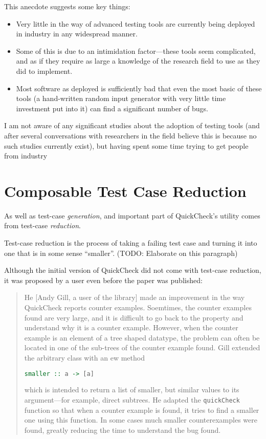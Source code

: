 This anecdote suggests some key things:

\begin{itemize}
\item Very little in the way of advanced testing tools are currently being deployed in industry in any widespread manner.
\item Some of this is due to an intimidation factor---these tools seem complicated,
and as if they require as large a knowledge of the research field to use as they did to implement.
\item Most software as deployed is sufficiently bad that even the most basic of these tools (a hand-written random input generator with very little time investment put into it) can find a significant number of bugs.
\end{itemize}

I am not aware of any significant studies about the adoption of testing tools (and after several conversations with researchers in the field believe this is because no such studies currently exist),
but having spent some time trying to get people from industry 

\chapter{Composable Test Case Reduction}

As well as test-case \emph{generation},
and important part of QuickCheck's utility comes from test-case \emph{reduction}.

Test-case reduction is the process of taking a failing test case and turning it into one that is in some sense ``smaller''.
(TODO: Elaborate on this paragraph)

Although the initial version of QuickCheck did not come with test-case reduction,
it was proposed by a user even before the paper was published:

\begin{quote}
He [Andy Gill, a user of the library] made an improvement in the way QuickCheck reports counter examples.
Soemtimes, the counter examples found are very large,
and it is difficult to go back to the property and understand why it is a counter example.
However,
when the counter example is an element of a tree shaped datatype,
the problem can often be located in one of the sub-trees of the counter example found.
Gill extended the arbitrary class with an ew method

\begin{lstlisting}[language=Haskell]
smaller :: a -> [a]
\end{lstlisting}

which is intended to return a list of smaller, but similar values to its argument---for example, direct subtrees.
He adapted the \texttt{quickCheck} function so that when a counter example is found,
it tries to find a smaller one using this function.
In some cases much smaller counterexamples were found,
greatly reducing the time to understand the bug found.
\end{quote}

